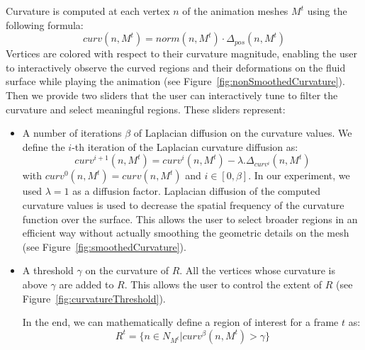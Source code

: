 Curvature is computed at each vertex $n$ of the animation meshes $M^t$ using the following formula:
\begin{equation}
curv(n,M^t) = norm(n,M^t) \cdot \Delta_{pos}(n,M^t)
\end{equation}
Vertices are colored with respect to their curvature magnitude, enabling the user to interactively observe the curved regions and their deformations on the fluid surface while playing the animation (see Figure~\ref{fig:nonSmoothedCurvature}). 
Then we provide two sliders that the user can interactively tune to filter the curvature and select meaningful regions.
These sliders represent:
\begin{itemize}
\item A number of iterations $\beta$ of Laplacian diffusion on the curvature values.
We define the $i$-th iteration of the Laplacian curvature diffusion as:
\begin{equation}
    curv^{i+1}(n,M^t) = curv^i(n,M^t) - \lambda . \Delta_{curv^i}(n,M^t)
\end{equation}
with $curv^0(n,M^t) = curv(n,M^t)$ and $i \in \left[0,\beta\right]$.
In our experiment, we used $\lambda=1$ as a diffusion factor.
Laplacian diffusion of the computed curvature values is used to decrease the spatial frequency of the curvature function over the surface.
This allows the user to select broader regions in an efficient way without actually smoothing the geometric details on the mesh (see Figure~\ref{fig:smoothedCurvature}). 
\item A threshold $\gamma$ on the curvature of $R$. All the vertices whose curvature is above $\gamma$ are added to $R$. This allows the user to control the extent of $R$ (see Figure~\ref{fig:curvatureThreshold}). 

In the end, we can mathematically define a region of interest for a frame $t$ as:
\begin{equation}
 R^t = \{ n\in N_{M^t} \vert curv^{\beta}(n,M^t) > \gamma \}
\end{equation}
\end{itemize}

